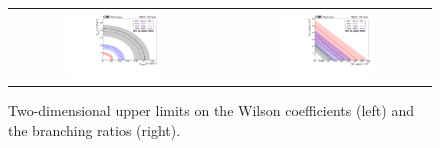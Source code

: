 \begin{figure}[tbh!]
 \begin{center}
 \begin{tabular}{cc}
  \includegraphics[width=0.48\textwidth]{figures/Part3/Results/Hist2D_WC}&
  \includegraphics[width=0.48\textwidth]{figures/Part3/Results/Hist2D_BR}\\
 \end{tabular}
 \caption{Two-dimensional upper limits on the Wilson coefficients (left) and the branching ratios (right).}
 \label{fig:2dlimit}
 \end{center}
\end{figure}
